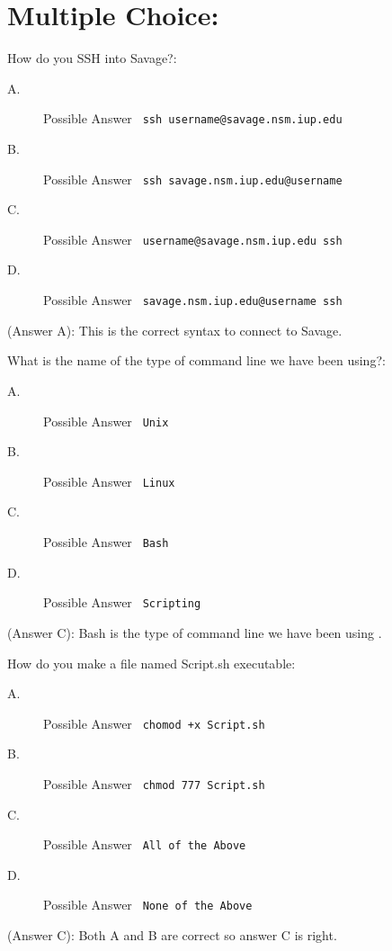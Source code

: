 \documentclass[12pt,answers]{exam}
\begin{document}
\section*{Multiple Choice:}
\begin{questions}
\question How do you SSH into Savage?:
\begin{description}
\item[A.] Possible Answer \verb' ssh username@savage.nsm.iup.edu'
\item[B.] Possible Answer \verb' ssh savage.nsm.iup.edu@username'
\item[C.] Possible Answer \verb' username@savage.nsm.iup.edu ssh'   
\item[D.] Possible Answer \verb' savage.nsm.iup.edu@username ssh'     
\end{description}
\begin{solution}
(Answer A): This is the correct syntax to connect to Savage.  
\end{solution}

\question What is the name of the type of command line we have been using?:
\begin{description}
\item[A.] Possible Answer \verb' Unix'
\item[B.] Possible Answer \verb' Linux'
\item[C.] Possible Answer \verb' Bash'    
\item[D.] Possible Answer \verb' Scripting'     
\end{description}
\begin{solution}
(Answer C): Bash is the type of command line we have been using .  
\end{solution}

\question How do you make a file named Script.sh executable:
\begin{description}
\item[A.] Possible Answer \verb' chomod +x Script.sh'
\item[B.] Possible Answer \verb' chmod 777 Script.sh'
\item[C.] Possible Answer \verb' All of the Above'   
\item[D.] Possible Answer \verb' None of the Above'     
\end{description}
\begin{solution}
(Answer C): Both A and B are correct so answer C is right.  
\end{solution}


\end{questions}
\end{document}
